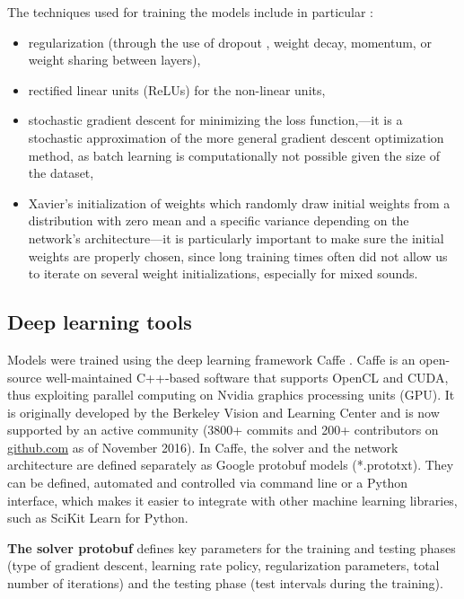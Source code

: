 The techniques used for training the models include in particular \parencite{lecun2012efficient}:%
\begin{itemize}
\itemsep-1.5em
\item regularization (through the use of dropout \parencite{srivastava2014dropout}, weight decay, momentum, or weight sharing between layers),
\item rectified linear units (ReLUs) for the non-linear units,
\item stochastic gradient descent for minimizing the loss function,---it is a stochastic approximation of the more general gradient descent optimization method, as batch learning is computationally not possible given the size of the dataset,
\item Xavier's initialization of weights \parencite{glorot2010understanding} which randomly draw initial weights from a distribution with zero mean and a specific variance depending on the network's architecture---it is particularly important to make sure the initial weights are properly chosen, since long training times often did not allow us to iterate on several weight initializations, especially for mixed sounds.
\end{itemize}

\subsection{Deep learning tools}

Models were trained using the deep learning framework Caffe \parencite{jia2014caffe}. Caffe is an open-source well-maintained C++-based software that supports OpenCL and CUDA, thus exploiting parallel computing on Nvidia graphics processing units (GPU). It is originally developed by the Berkeley Vision and Learning Center and is now supported by an active community (\num[group-separator={,}]{3800}+ commits and \num[group-separator={,}]{200}+ contributors on \url{github.com} as of November 2016). In Caffe, the solver and the network architecture are defined separately as Google protobuf models (*.prototxt). They can be defined, automated and controlled via command line or a Python interface, which makes it easier to integrate with other machine learning libraries, such as SciKit Learn for Python.

\textbf{The solver protobuf} defines key parameters for the training and testing phases (type of gradient descent, learning rate policy, regularization parameters, total number of iterations) and the testing phase (test intervals during the training).

